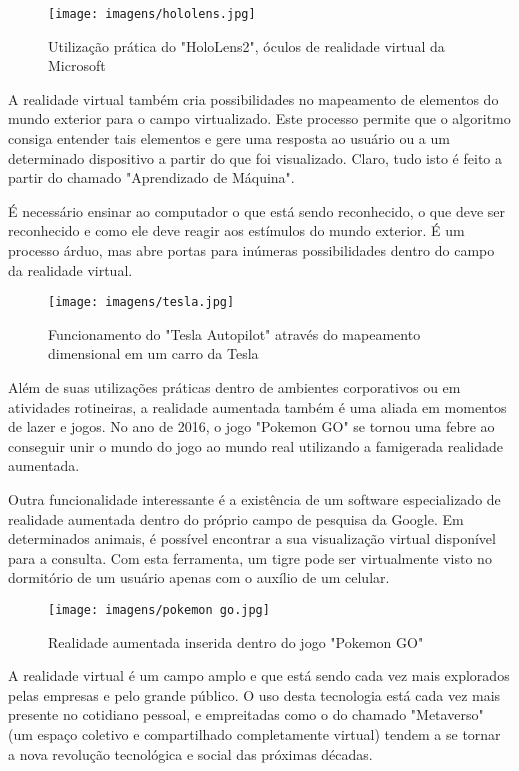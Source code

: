 \documentclass[a4paper, 10pt]{article}
\begin{document}
\begin{figure}[H]
    \centering
    \texttt{[image: imagens/hololens.jpg]}
    \caption{Utilização prática do "HoloLens2", óculos de realidade virtual da Microsoft}
    \label{fig:my_label}
    \citep{hololens}
\end{figure}

A realidade virtual também cria possibilidades no mapeamento de elementos do mundo exterior para o campo virtualizado. Este processo permite que o algoritmo consiga entender tais elementos e gere uma resposta ao usuário ou a um determinado dispositivo a partir do que foi visualizado.
Claro, tudo isto é feito a partir do chamado "Aprendizado de Máquina". 

É necessário ensinar ao computador o que está sendo reconhecido, o que deve ser reconhecido e como ele deve reagir aos estímulos do mundo exterior. É um processo árduo, mas abre portas para inúmeras possibilidades dentro do campo da realidade virtual.

\begin{figure}[H]
    \centering
    \texttt{[image: imagens/tesla.jpg]}
    \caption{Funcionamento do "Tesla Autopilot" através do mapeamento dimensional em um carro da Tesla}
    \label{fig:my_label}
    \citep{tesla}
\end{figure}

Além de suas utilizações práticas dentro de ambientes corporativos ou em atividades rotineiras, a realidade aumentada também é uma aliada em momentos de lazer e jogos. No ano de 2016, o jogo "Pokemon GO" se tornou uma febre ao conseguir unir o mundo do jogo ao mundo real utilizando a famigerada realidade aumentada. 

Outra funcionalidade interessante é a existência de um software especializado de realidade aumentada dentro do próprio campo de pesquisa da Google. Em determinados animais, é possível encontrar a sua visualização virtual disponível para a consulta. Com esta ferramenta, um tigre pode ser virtualmente visto no dormitório de um usuário apenas com o auxílio de um celular. 

\begin{figure}[H]
    \centering
    \texttt{[image: imagens/pokemon go.jpg]}
    \caption{Realidade aumentada inserida dentro do jogo "Pokemon GO"}
    \label{fig:my_label}
    \citep{pgo}
\end{figure}
A realidade virtual é um campo amplo e que está sendo cada vez mais explorados pelas empresas e pelo grande público. O uso desta tecnologia está cada vez mais presente no cotidiano pessoal, e empreitadas como o do chamado "Metaverso" (um espaço coletivo e compartilhado completamente virtual) tendem a se tornar a nova revolução tecnológica e social das próximas décadas.
\end{document}
